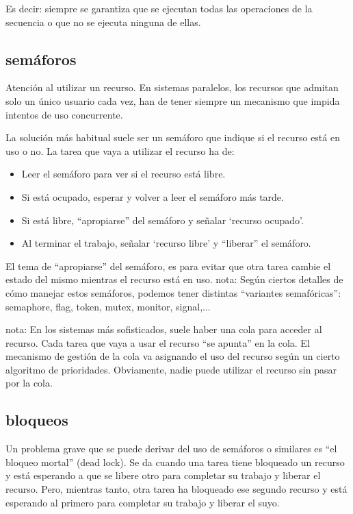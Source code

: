 \documentclass[spanish,12pt,a4paper,final,oneside]{book}
\begin{document}
Es decir: siempre se garantiza que se ejecutan todas las operaciones de la secuencia o que no se ejecuta ninguna de ellas.

\subsection{semáforos}
Atención al utilizar un recurso. En sistemas paralelos, los recursos que admitan solo un único usuario cada vez, han de tener siempre un mecanismo que impida intentos de uso concurrente.

La solución más habitual suele ser un semáforo  que indique si el recurso está en uso o no. La tarea que vaya a utilizar el recurso ha de:
\begin{itemize}
\item Leer el semáforo para ver si el recurso está libre.
\item Si está ocupado, esperar y volver a leer el semáforo más tarde.
\item Si está libre, ``apropiarse'' del semáforo y señalar `recurso ocupado'.
\item Al terminar el trabajo, señalar `recurso libre' y ``liberar'' el semáforo.
\end{itemize}

El tema de ``apropiarse'' del semáforo, es para evitar que otra tarea cambie el estado del mismo mientras el recurso está en uso.
nota: Según ciertos detalles de cómo manejar estos semáforos, podemos tener distintas ``variantes semafóricas'': semaphore, flag, token, mutex, monitor, signal,...

nota: En los sistemas más sofisticados, suele haber una cola para acceder al recurso. Cada tarea que vaya a usar el recurso ``se apunta'' en la cola. El mecanismo de gestión de la cola va asignando el uso del recurso según un cierto algoritmo de prioridades. Obviamente, nadie puede utilizar el recurso sin pasar por la cola.

\subsection{bloqueos}
Un problema grave que se puede derivar del uso de semáforos o similares es ``el bloqueo mortal'' (dead lock). Se da cuando una tarea tiene bloqueado un recurso y está esperando a que se libere otro para completar su trabajo y liberar el recurso. Pero, mientras tanto, otra tarea ha bloqueado ese segundo recurso y está esperando al primero para completar su trabajo y liberar el suyo.
\end{document}

